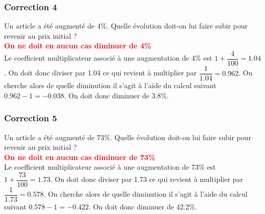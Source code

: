 \documentclass[15pt, mathserif]{beamer}
\begin{document}
\begin{frame}
\vspace{-10mm}
	\frametitle{Correction 4}
\vspace*{1cm} Un article a été augmenté de 4\%. Quelle évolution doit-on lui faire subir pour revenir au prix initial ? \\ \bcattention \textcolor{red}{\textbf{On ne doit en aucun cas diminuer de 4\% }} \\ Le coefficient multiplicateur associé à une augmentation de 4\% est $1+\dfrac{4}{100}=1.04$. On doit donc diviser par 1.04 ce qui revient à multiplier par $\dfrac{1}{1.04}=0.962$. On cherche alors de quelle diminution il s'agit à l'aide du calcul suivant $0.962-1=-0.038$. On doit donc diminuer de 3.8\%. \\ \begin{center}  
  \end{center}\end{frame}


\begin{frame}
\vspace{-10mm}
	\frametitle{Correction 5}
\vspace*{1cm} Un article a été augmenté de 73\%. Quelle évolution doit-on lui faire subir pour revenir au prix initial ? \\ \bcattention \textcolor{red}{\textbf{On ne doit en aucun cas diminuer de 73\% }} \\ Le coefficient multiplicateur associé à une augmentation de 73\% est $1+\dfrac{73}{100}=1.73$. On doit donc diviser par 1.73 ce qui revient à multiplier par $\dfrac{1}{1.73}=0.578$. On cherche alors de quelle diminution il s'agit à l'aide du calcul suivant $0.578-1=-0.422$. On doit donc diminuer de 42.2\%. \\ \begin{center}  
  \end{center}\end{frame}
\end{document}
